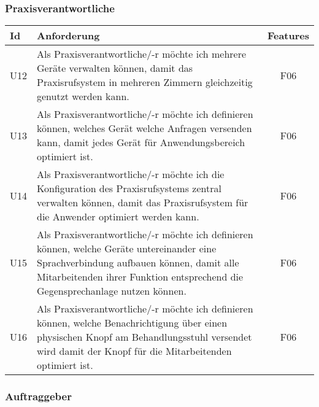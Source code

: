 \clearpage

\subsubsection*{Praxisverantwortliche}

\begin{table}[h]
    \centering
    \begin{tabular}{|l|p{13cm}|c|}
        \hline
        \textbf{Id} & \textbf{Anforderung}                                                                                                                                                                               & \textbf{Features} \\
        \hline
        U12         & Als Praxisverantwortliche/-r möchte ich mehrere Geräte verwalten können, damit das Praxisrufsystem in mehreren Zimmern gleichzeitig genutzt werden kann. & F06 \\
        \hline
        U13         & Als Praxisverantwortliche/-r möchte ich definieren können, welches Gerät welche Anfragen versenden kann, damit jedes Gerät für Anwendungsbereich optimiert ist. & F06 \\
        \hline
        U14         & Als Praxisverantwortliche/-r möchte ich die Konfiguration des Praxisrufsystems zentral verwalten können, damit das Praxisrufsystem für die Anwender optimiert werden kann. & F06 \\
        \hline
        U15         & Als Praxisverantwortliche/-r möchte ich definieren können, welche Geräte untereinander eine Sprachverbindung aufbauen können, damit alle Mitarbeitenden ihrer Funktion entsprechend die Gegensprechanlage nutzen können. & F06 \\
        \hline
        U16         & Als Praxisverantwortliche/-r möchte ich definieren können, welche Benachrichtigung über einen physischen Knopf am Behandlungsstuhl versendet wird damit der Knopf für die Mitarbeitenden optimiert ist. & F06 \\
        \hline
    \end{tabular}\label{tab:userstories2}
\end{table}

\subsubsection*{Auftraggeber}\label{subsec:auftraggeber}

